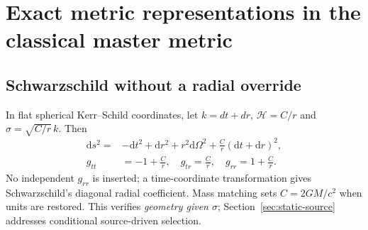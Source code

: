 \documentclass[11pt,a4paper]{article}
\newcommand{\dd}{\mathrm d}
\begin{document}
\section{Exact metric representations in the classical master metric}\label{sec:solutions}
\subsection{Schwarzschild without a radial override}
In flat spherical Kerr--Schild coordinates, let $k=dt+dr$, $\mathcal H=C/r$ and $\sigma=\sqrt{C/r}\,k$. Then
\begin{equation}\label{eq:schw-ks}
\begin{aligned}
\dd s^2={}&-\dd t^2+\dd r^2+r^2\dd\Omega^2
+\frac Cr(\dd t+\dd r)^2,\\
 g_{tt}&=-1+\frac Cr,\quad g_{tr}=\frac Cr,
 \quad g_{rr}=1+\frac Cr.
\end{aligned}
\end{equation}
No independent $g_{rr}$ is inserted; a time-coordinate transformation gives Schwarzschild's diagonal radial coefficient. Mass matching sets $C=2GM/c^2$ when units are restored. This verifies \emph{geometry given $\sigma$}; Section~\ref{sec:static-source} addresses conditional source-driven selection.
\end{document}
